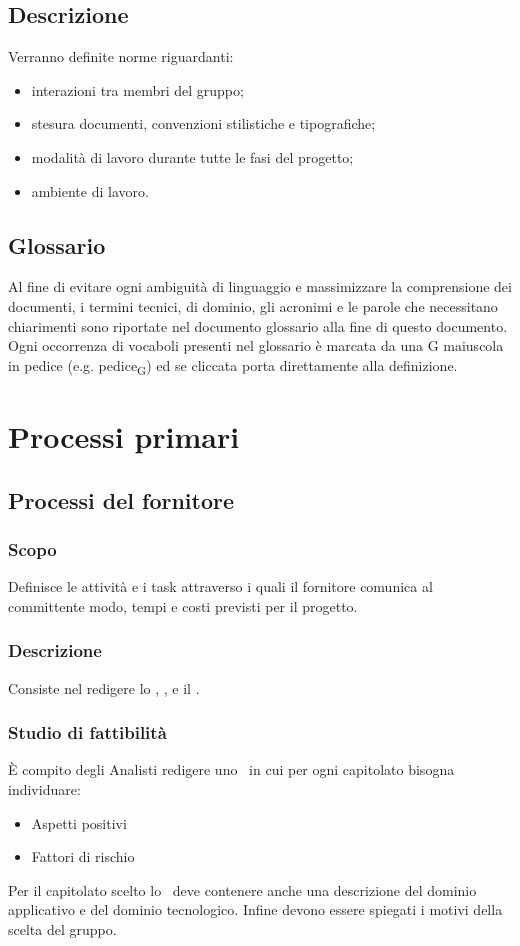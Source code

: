 \documentclass[12pt,a4paper]{article}
\begin{document}
\subsection{Descrizione}
Verranno definite norme riguardanti:
\begin{itemize}
	\item interazioni tra membri del gruppo;
	\item stesura documenti, convenzioni stilistiche e tipografiche;
	\item modalità di lavoro durante tutte le fasi del progetto;
	\item ambiente di lavoro.
\end{itemize}

\subsection{Glossario}
Al fine di evitare ogni ambiguità di linguaggio e massimizzare la comprensione dei documenti, i termini tecnici, di dominio, gli acronimi e le parole che necessitano chiarimenti sono riportate nel documento glossario alla fine di questo documento. Ogni occorrenza di vocaboli presenti nel glossario è marcata da una G maiuscola in pedice (e.g. pedice\textsubscript{G}) ed se cliccata porta direttamente alla definizione.

\newpage

\section{Processi primari}

\subsection{Processi del fornitore}


\subsubsection{Scopo}
Definisce le attività e i task attraverso i quali il fornitore comunica al committente modo, tempi e costi previsti per il progetto.

\subsubsection{Descrizione}
Consiste nel redigere lo \SdF, \PdQ, e il \PdP.

\subsubsection{Studio di fattibilità}
È compito degli Analisti redigere uno \SdF\ in cui per ogni capitolato bisogna individuare:
\begin{itemize}
	\item Aspetti positivi
	\item Fattori di rischio
\end{itemize}
Per il capitolato scelto lo \SdF\ deve contenere anche una descrizione del dominio applicativo e del dominio tecnologico. Infine devono essere spiegati i motivi della scelta del gruppo.
\end{document}
